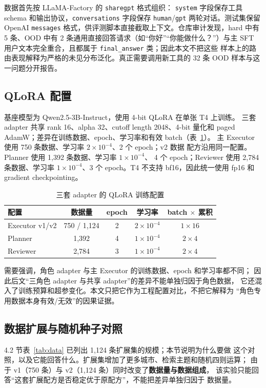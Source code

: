 \documentclass[UTF8,a4paper,12pt]{ctexart}
\begin{document}
数据首先按 LLaMA-Factory 的 \texttt{sharegpt} 格式组织：
\texttt{system} 字段保存工具 schema 和输出协议，\texttt{conversations}
字段保存 \texttt{human}/\texttt{gpt} 两轮对话。测试集保留 OpenAI
\texttt{messages} 格式，供评测脚本直接截取上下文。仓库审计发现，hard 中有
5 条、OOD 中有 2 条通用直接回答请求（如“你好”“你能做什么？”）与主 SFT
用户文本完全重合，且都属于 \texttt{final\_answer} 类；因此本文不把这些
样本上的路由表现解释为严格的未见分布泛化。真正需要调用新工具的 32 条 OOD
样本与这一问题分开报告。

\subsection{QLoRA 配置}
基座模型为 Qwen2.5-3B-Instruct，使用 4-bit QLoRA 在单张 T4 上训练。
三套 adapter 共享 rank 16、alpha 32、cutoff length 2048、4-bit 量化和
paged AdamW；差异在训练数据、epoch、学习率和有效 batch（表~\ref{tab:train}）。
主 Executor 使用 750 条数据、学习率 $2\times10^{-4}$、2 个 epoch；v2 数据
配方沿用同一配置。Planner 使用 1,392 条数据、学习率 $1\times10^{-4}$、
4 个 epoch；Reviewer 使用 2,784 条数据、学习率 $1\times10^{-4}$、3 个
epoch。T4 不支持 bf16，因此统一使用 fp16 和 gradient checkpointing。

\begin{table}[H]
  \centering
  \small
  \caption{三套 adapter 的 QLoRA 训练配置}
  \label{tab:train}
  \begin{tabular}{lcccc}
    \toprule
    配置 & 数据量 & epoch & 学习率 & batch $\times$ 累积 \\
    \midrule
    Executor v1/v2 & 750 / 1,124 & 2 & $2\times10^{-4}$ & $1\times16$ \\
    Planner & 1,392 & 4 & $1\times10^{-4}$ & $2\times4$ \\
    Reviewer & 2,784 & 3 & $1\times10^{-4}$ & $2\times4$ \\
    \bottomrule
  \end{tabular}
\end{table}

需要强调，角色 adapter 与主 Executor 的训练数据、epoch 和学习率都不同；
因此后文“三角色 adapter 与共享 adapter”的差异不能单独归因于角色数据，
它还混入了训练预算和超参变化。本文只把它作为工程配置对比，不把它解释为
“角色专用数据本身有效/无效”的因果证据。

\subsection{数据扩展与随机种子对照}
4.2 节表~\ref{tab:data} 已列出 1,124 条扩展集的规模；本节说明为什么要做
这个对照，以及它能回答什么。扩展集增加了更多城市、检索主题和随机四则运算；
由于 v1（750 条）与 v2（1,124 条）同时改变了\textbf{数据量与数据组成}，
该实验只能回答“这套扩展配方是否稳定优于原配方”，不能把差异单独归因于
数据量。
\end{document}
